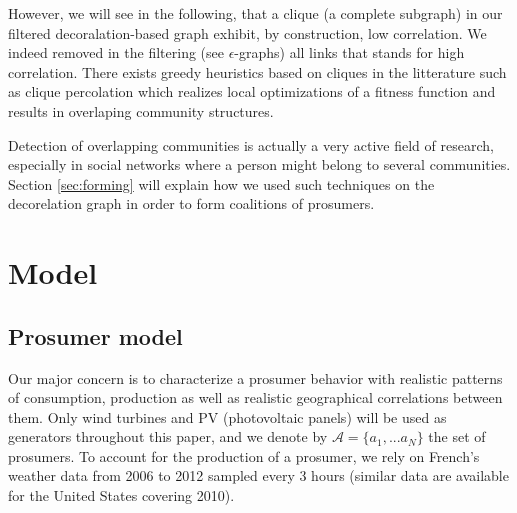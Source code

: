\documentclass[conference]{IEEEtran}
\begin{document}
However, we will see in the following, that a clique (a complete subgraph) in our filtered decoralation-based graph exhibit, by construction, low correlation. We indeed removed in the filtering (see $\epsilon$-graphs) all links that stands for high correlation. There exists greedy heuristics based on cliques in the litterature such as clique percolation \cite{Lancichinetti} which realizes local optimizations of a fitness function and results in overlaping community structures. 

Detection of overlapping communities is actually a very active field of research, especially in social networks where a person might belong to several communities. Section \ref{sec:forming} will explain how we used such techniques on the decorelation graph in order to form coalitions of prosumers.


%
%

\section{Model}
\label{sec:model}
\subsection{Prosumer model}\label{subsec:ProsumerModel}

Our major concern is to characterize a prosumer behavior with realistic patterns of consumption, production as well as realistic geographical correlations between them. Only wind turbines and PV (photovoltaic panels) will be used as generators throughout this paper, and we denote by $ \mathcal{A} = \{ a_{1},...a_{N} \} $ the set of prosumers. To account for the production of a prosumer, we rely on French's weather data from 2006 to 2012 sampled every 3 hours \cite{Infoclimat} (similar data are available for the United States covering 2010\cite{NCDC}). 
\end{document}
